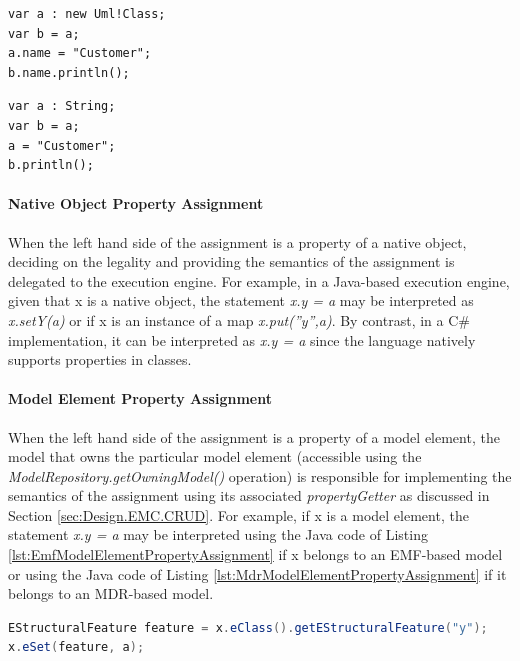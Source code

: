 \begin{lstlisting}[float=tbp, caption=Assigning the value of a variable by reference, label=lst:VariableAssignmentByReference, language=EOL]
var a : new Uml!Class;
var b = a;
a.name = "Customer";
b.name.println();
\end{lstlisting}

\begin{lstlisting}[float=tbp, caption=Assigning the value of a variable by value, label=lst:VariableAssignmentByValue, language=EOL]
var a : String;
var b = a;
a = "Customer";
b.println();
\end{lstlisting}

\paragraph{Native Object Property Assignment}

When the left hand side of the assignment is a property of a native object, deciding on the legality and providing the semantics of the assignment is delegated to the execution engine. For example, in a Java-based execution engine, given that x is a native object, the statement \emph{x.y = a} may be interpreted as \emph{x.setY(a)} or if x is an instance of a map \emph{x.put(''y'',a)}. By contrast, in a C\# implementation, it can be interpreted as \emph{x.y = a} since
the language natively supports properties in classes.

\paragraph{Model Element Property Assignment}

When the left hand side of the assignment is a property of a model element, the model that owns the particular model element (accessible using the \emph{ModelRepository.getOwningModel() }operation) is responsible for implementing the semantics of the assignment using its associated \emph{propertyGetter} as discussed in Section \ref{sec:Design.EMC.CRUD}. For example, if x is a model element, the statement \emph{x.y = a} may be interpreted using the Java code of Listing \ref{lst:EmfModelElementPropertyAssignment} if x belongs to an EMF-based model or using the Java code of Listing \ref{lst:MdrModelElementPropertyAssignment} if it belongs to an MDR-based model.

\begin{lstlisting}[float=tbp, caption=Java code that assigns the value of a property of a model element that belongs to an EMF-based model, label=lst:EmfModelElementPropertyAssignment, language=Java]
EStructuralFeature feature = x.eClass().getEStructuralFeature("y");
x.eSet(feature, a);
\end{lstlisting}

